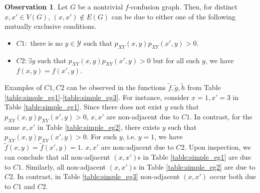 \documentclass[journal, onecolumn, draftcls]{IEEEtran}
\theoremstyle{definition}
\newtheorem{observation}{Observation}
\newcommand{\calY}{\mathcal{Y}}
\newcommand{\meng}[1]{\marginpar{+}{\bf Ruoyu's remark}: {\em #1}}
\newcommand{\aditya}[1]{\marginpar{+}{\bf Aditya's remark}: {\em #1}}
\begin{document}
\begin{observation}
Let $G$ be a nontrivial $f$-confusion graph. Then, for distinct $x, x'\in V(G)$, $(x,x')\notin E(G)$   can be due to either one of the  following mutually exclusive conditions.
\begin{itemize}[leftmargin=5mm]
    \item $C1:$ there is no  $y \in \calY$  such that  $p_{XY}(x,y)p_{XY}(x',y)> 0$.
    \item  $C2: \exists y$ such that $p_{XY}(x,y)p_{XY}(x',y)> 0$ but for all such $y$,  we have $f(x,y) = f(x',y)$.
\end{itemize}    
\end{observation}
Examples of $C1,C2$ can be observed in the functions $\tilde f,\tilde g,\tilde h$ from Table \ref{table:simple_eg1}-\ref{table:simple_eg3}. For instance, consider $x=1,x'=3$ in Table \ref{table:simple_eg1}. Since there does not exist $y$ such that $p_{XY}(x,y)p_{XY}(x',y)>0$, $x,x'$ are non-adjacent due to $C1$. In contrast, for the same $x,x'$ in Table \ref{table:simple_eg2}, there exists $y$ such that $p_{XY}(x,y)p_{XY}(x',y)>0$. For such $y$, i.e. $y=1$, we have   $\tilde f(x,y)=\tilde f(x',y)=1 $.   $x,x'$ are non-adjacent due to $C2$.  Upon inspection, we can conclude that all non-adjacent $(x,x')$s in Table \ref{table:simple_eg1} are due to $C1$.  Similarly, all non-adjacent $(x,x')$s in Table \ref{table:simple_eg2} are due to $C2$. In contrast, in Table \ref{table:simple_eg3} non-adjacent $(x,x')$ occur both due to $C1$ and $C2$. %


\end{document}
